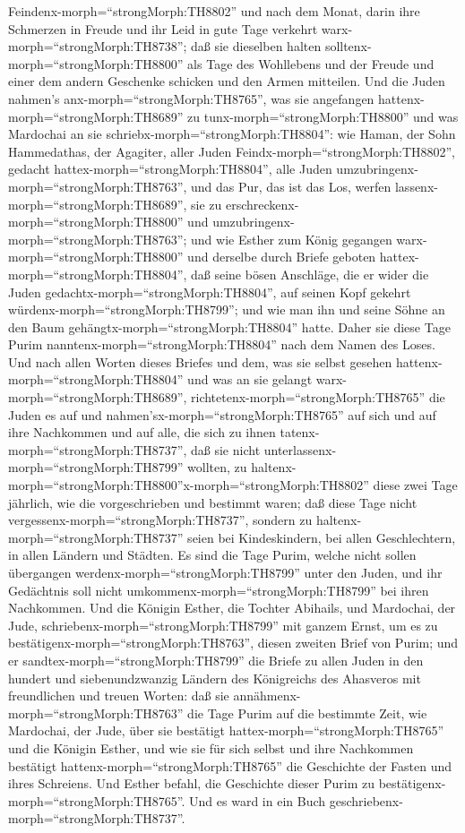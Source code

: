Feindenx-morph=``strongMorph:TH8802'' und nach dem Monat, darin ihre
Schmerzen in Freude und ihr Leid in gute Tage verkehrt
warx-morph=``strongMorph:TH8738''; daß sie dieselben halten
solltenx-morph=``strongMorph:TH8800'' als Tage des Wohllebens und der
Freude und einer dem andern Geschenke schicken und den Armen mitteilen.
 Und die Juden nahmen's anx-morph=``strongMorph:TH8765'',
was sie angefangen hattenx-morph=``strongMorph:TH8689'' zu
tunx-morph=``strongMorph:TH8800'' und was Mardochai an sie
schriebx-morph=``strongMorph:TH8804'':  wie Haman, der Sohn
Hammedathas, der Agagiter, aller Juden
Feindx-morph=``strongMorph:TH8802'', gedacht
hattex-morph=``strongMorph:TH8804'', alle Juden
umzubringenx-morph=``strongMorph:TH8763'', und das Pur, das ist das Los,
werfen lassenx-morph=``strongMorph:TH8689'', sie zu
erschreckenx-morph=``strongMorph:TH8800'' und
umzubringenx-morph=``strongMorph:TH8763'';  und wie Esther
zum König gegangen warx-morph=``strongMorph:TH8800'' und derselbe durch
Briefe geboten hattex-morph=``strongMorph:TH8804'', daß seine bösen
Anschläge, die er wider die Juden gedachtx-morph=``strongMorph:TH8804'',
auf seinen Kopf gekehrt würdenx-morph=``strongMorph:TH8799''; und wie
man ihn und seine Söhne an den Baum
gehängtx-morph=``strongMorph:TH8804'' hatte.  Daher sie
diese Tage Purim nanntenx-morph=``strongMorph:TH8804'' nach dem Namen
des Loses. Und nach allen Worten dieses Briefes und dem, was sie selbst
gesehen hattenx-morph=``strongMorph:TH8804'' und was an sie gelangt
warx-morph=``strongMorph:TH8689'', 
richtetenx-morph=``strongMorph:TH8765'' die Juden es auf und
nahmen'sx-morph=``strongMorph:TH8765'' auf sich und auf ihre Nachkommen
und auf alle, die sich zu ihnen tatenx-morph=``strongMorph:TH8737'', daß
sie nicht unterlassenx-morph=``strongMorph:TH8799'' wollten, zu
haltenx-morph=``strongMorph:TH8800''x-morph=``strongMorph:TH8802'' diese
zwei Tage jährlich, wie die vorgeschrieben und bestimmt waren;
 daß diese Tage nicht
vergessenx-morph=``strongMorph:TH8737'', sondern zu
haltenx-morph=``strongMorph:TH8737'' seien bei Kindeskindern, bei allen
Geschlechtern, in allen Ländern und Städten. Es sind die Tage Purim,
welche nicht sollen übergangen werdenx-morph=``strongMorph:TH8799''
unter den Juden, und ihr Gedächtnis soll nicht
umkommenx-morph=``strongMorph:TH8799'' bei ihren Nachkommen.
 Und die Königin Esther, die Tochter Abihails, und
Mardochai, der Jude, schriebenx-morph=``strongMorph:TH8799'' mit ganzem
Ernst, um es zu bestätigenx-morph=``strongMorph:TH8763'', diesen zweiten
Brief von Purim;  und er
sandtex-morph=``strongMorph:TH8799'' die Briefe zu allen Juden in den
hundert und siebenundzwanzig Ländern des Königreichs des Ahasveros mit
freundlichen und treuen Worten:  daß sie
annähmenx-morph=``strongMorph:TH8763'' die Tage Purim auf die bestimmte
Zeit, wie Mardochai, der Jude, über sie bestätigt
hattex-morph=``strongMorph:TH8765'' und die Königin Esther, und wie sie
für sich selbst und ihre Nachkommen bestätigt
hattenx-morph=``strongMorph:TH8765'' die Geschichte der Fasten und ihres
Schreiens.  Und Esther befahl, die Geschichte dieser Purim
zu bestätigenx-morph=``strongMorph:TH8765''. Und es ward in ein Buch
geschriebenx-morph=``strongMorph:TH8737''.

